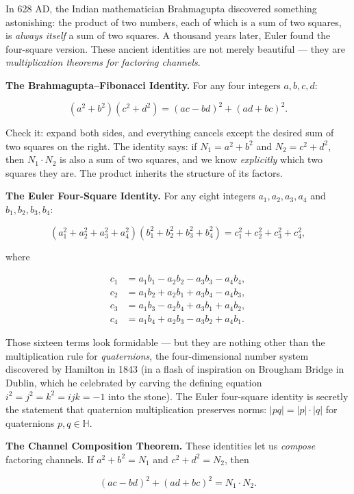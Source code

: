 \documentclass[12pt, letterpaper, openany]{book}
\theoremstyle{definition}
\theoremstyle{remark}
\begin{document}
In 628 AD, the Indian mathematician Brahmagupta discovered something astonishing: the product of two numbers, each of which is a sum of two squares, is \textit{always itself} a sum of two squares. A thousand years later, Euler found the four-square version. These ancient identities are not merely beautiful --- they are \textit{multiplication theorems for factoring channels}.

\textbf{The Brahmagupta--Fibonacci Identity.} For any four integers $a, b, c, d$:

\[
(a^2 + b^2)(c^2 + d^2) = (ac - bd)^2 + (ad + bc)^2.
\]

Check it: expand both sides, and everything cancels except the desired sum of two squares on the right. The identity says: if $N_1 = a^2 + b^2$ and $N_2 = c^2 + d^2$, then $N_1 \cdot N_2$ is also a sum of two squares, and we know \textit{explicitly} which two squares they are. The product inherits the structure of its factors.

\textbf{The Euler Four-Square Identity.} For any eight integers $a_1, a_2, a_3, a_4$ and $b_1, b_2, b_3, b_4$:

\[
(a_1^2 + a_2^2 + a_3^2 + a_4^2)(b_1^2 + b_2^2 + b_3^2 + b_4^2) = c_1^2 + c_2^2 + c_3^2 + c_4^2,
\]

where

\[
\begin{aligned}
c_1 &= a_1 b_1 - a_2 b_2 - a_3 b_3 - a_4 b_4, \\
c_2 &= a_1 b_2 + a_2 b_1 + a_3 b_4 - a_4 b_3, \\
c_3 &= a_1 b_3 - a_2 b_4 + a_3 b_1 + a_4 b_2, \\
c_4 &= a_1 b_4 + a_2 b_3 - a_3 b_2 + a_4 b_1.
\end{aligned}
\]

Those sixteen terms look formidable --- but they are nothing other than the multiplication rule for \textit{quaternions}, the four-dimensional number system discovered by Hamilton in 1843 (in a flash of inspiration on Brougham Bridge in Dublin, which he celebrated by carving the defining equation $i^2 = j^2 = k^2 = ijk = -1$ into the stone). The Euler four-square identity is secretly the statement that quaternion multiplication preserves norms: $|pq| = |p| \cdot |q|$ for quaternions $p, q \in \mathbb{H}$.

\textbf{The Channel Composition Theorem.} These identities let us \textit{compose} factoring channels. If $a^2 + b^2 = N_1$ and $c^2 + d^2 = N_2$, then

\[
(ac - bd)^2 + (ad + bc)^2 = N_1 \cdot N_2.
\]
\end{document}
